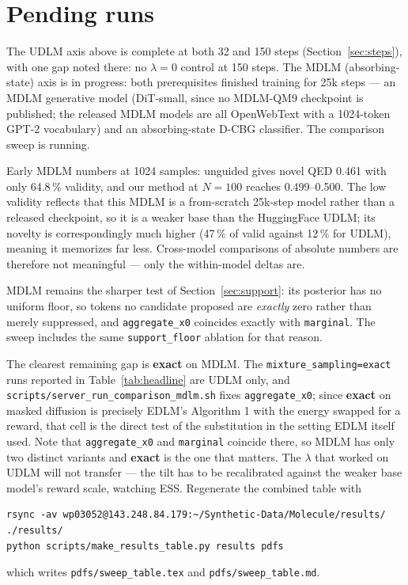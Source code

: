 \documentclass[11pt]{article}
\begin{document}
\section{Pending runs}
\label{sec:pending}

The UDLM axis above is complete at both 32 and 150 steps
(Section~\ref{sec:steps}), with one gap noted there: no $\lambda = 0$ control at
150 steps. The MDLM (absorbing-state) axis is in progress:
both prerequisites finished training for 25k steps --- an MDLM generative model
(DiT-small, since no MDLM-QM9 checkpoint is published; the released MDLM models
are all OpenWebText with a 1024-token GPT-2 vocabulary) and an absorbing-state
D-CBG classifier. The comparison sweep is running.

Early MDLM numbers at 1024 samples: unguided gives novel QED 0.461 with only
64.8\,\% validity, and our method at $N = 100$ reaches 0.499--0.500. The low
validity reflects that this MDLM is a from-scratch 25k-step model rather than a
released checkpoint, so it is a weaker base than the HuggingFace UDLM; its
novelty is correspondingly much higher (47\,\% of valid against 12\,\% for
UDLM), meaning it memorizes far less. Cross-model comparisons of absolute
numbers are therefore not meaningful --- only the within-model deltas are.

MDLM remains the sharper test of Section~\ref{sec:support}: its posterior has no
uniform floor, so tokens no candidate proposed are \emph{exactly} zero rather
than merely suppressed, and \texttt{aggregate\_x0} coincides exactly with
\texttt{marginal}. The sweep includes the same \texttt{support\_floor} ablation
for that reason.

The clearest remaining gap is \textbf{exact} on MDLM. The
\texttt{mixture\_sampling=exact} runs reported in Table~\ref{tab:headline} are
UDLM only, and \texttt{scripts/server\_run\_comparison\_mdlm.sh} fixes
\texttt{aggregate\_x0}; since \textbf{exact} on masked diffusion is precisely
EDLM's Algorithm 1 with the energy swapped for a reward, that cell is the direct
test of the substitution in the setting EDLM itself used. Note that
\texttt{aggregate\_x0} and \texttt{marginal} coincide there, so MDLM has only two
distinct variants and \textbf{exact} is the one that matters. The $\lambda$ that
worked on UDLM will not transfer --- the tilt has to be recalibrated against the
weaker base model's reward scale, watching ESS.
Regenerate the combined table with
\begin{verbatim}
rsync -av wp03052@143.248.84.179:~/Synthetic-Data/Molecule/results/ ./results/
python scripts/make_results_table.py results pdfs
\end{verbatim}
which writes \texttt{pdfs/sweep\_table.tex} and \texttt{pdfs/sweep\_table.md}.
\end{document}
